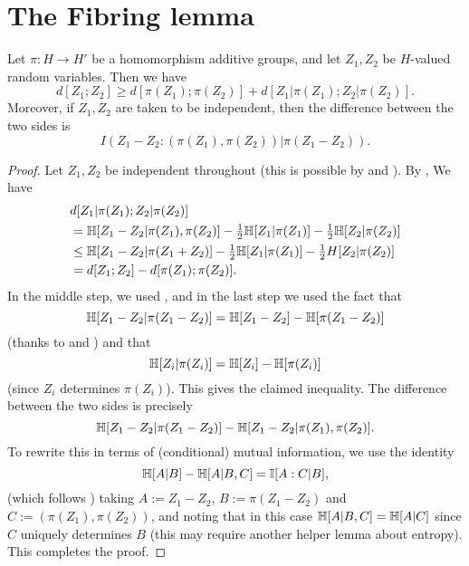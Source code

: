 \chapter{The Fibring lemma}

\begin{proposition}\label{fibring-ident}
  \leanok
  Let $\pi : H \to H'$ be a homomorphism additive groups, and let $Z_1,Z_2$ be $H$-valued random variables. Then we have
  \[
    d[Z_1; Z_2] \geq d[\pi(Z_1);\pi(Z_2)] + d[Z_1|\pi(Z_1); Z_2 |\pi(Z_2)].
  \]
  Moreover, if $Z_1,Z_2$ are taken to be independent, then the difference between the two sides is
$$I( Z_1 - Z_2 : (\pi(Z_1), \pi(Z_2))  |  \pi(Z_1 - Z_2) ).$$
\end{proposition}


\begin{proof}\leanok
  Let $Z_1,Z_2$ be independent throughout (this is possible by  and ).  By , We have
  \begin{align*}
    & d[Z_1  |\pi(Z_1); Z_2 |\pi(Z_2)] \\
    & = \mathbb{H}[Z_1 - Z_2 | \pi(Z_1),\pi(Z_2)] - \tfrac{1}{2} \mathbb{H}[Z_1 | \pi(Z_1)] - \tfrac{1}{2} \mathbb{H}[Z_2 | \pi(Z_2)] \\
    & \leq  \mathbb{H}[Z_1 - Z_2 | \pi(Z_1+Z_2)]  - \tfrac{1}{2} \mathbb{H}[Z_1 | \pi(Z_1)] - \tfrac{1}{2}H[Z_2 | \pi(Z_2)] \\
    & = d[Z_1;Z_2] - d[\pi(Z_1);\pi(Z_2)].
  \end{align*}
  In the middle step, we used , and in the last step we used the fact that
  \[\mathbb{H}[Z_1 - Z_2 |  \pi(Z_1-Z_2)] = \mathbb{H}[Z_1 - Z_2] - \mathbb{H}[\pi(Z_1-Z_2)]\]
  (thanks to  and ) and that
  \[\mathbb{H}[Z_i| \pi(Z_i)] = \mathbb{H}[Z_i] - \mathbb{H}[\pi(Z_i)]\] (since $Z_i$ determines $\pi(Z_i)$).
  This gives the claimed inequality. The difference between the two sides is precisely
  \[\mathbb{H}[Z_1 - Z_2  | \pi(Z_1 - Z_2)] - \mathbb{H}[Z_1 - Z_2  | \pi(Z_1),\pi(Z_2)].\]
  To rewrite this in terms of (conditional) mutual information, we use the identity
  \[\mathbb{H}[A|B] - \mathbb{H}[A | B,C] = \mathbb{I}[A : C | B],\]
  (which follows )
  taking
  $A := Z_1 - Z_2$, $B := \pi(Z_1 - Z_2)$ and $C := (\pi(Z_1),\pi(Z_{2}))$, and noting that in this case $\mathbb{H}[A | B,C] = \mathbb{H}[A | C]$ since $C$ uniquely determines $B$ (this may require another helper lemma about entropy).
  This completes the proof.
\end{proof}


